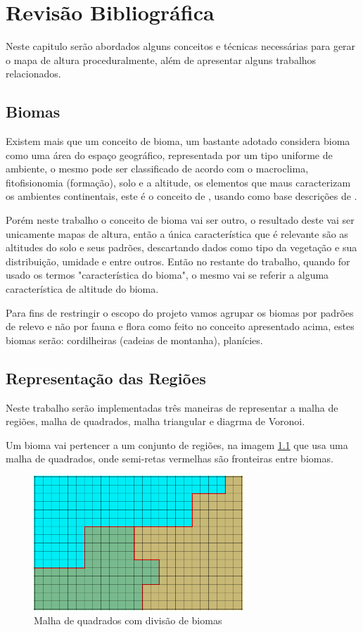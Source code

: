 \chapter{Revisão Bibliográfica}
Neste capitulo serão abordados alguns conceitos e técnicas necessárias para
gerar o mapa de altura proceduralmente, além de apresentar alguns trabalhos
relacionados.

\section{Biomas} %
Existem mais que um conceito de bioma, um bastante adotado considera bioma como
uma área do espaço geográfico, representada por um tipo uniforme de ambiente, o
mesmo pode ser classificado de acordo com o macroclima, fitofisionomia (formação),
solo e a altitude, os elementos que maus caracterizam os ambientes continentais, 
este é o conceito de \cite{coutinho2006conceito}, usando como base descrições
de \cite{walter1986vegetaccao}.

Porém neste trabalho o conceito de bioma vai ser outro, o resultado deste
vai ser unicamente mapas de altura, então a única característica que é relevante
são as altitudes do solo e seus padrões, descartando dados como tipo da
vegetação e sua distribuição, umidade e entre outros. Então no restante 
do trabalho, quando for usado os termos "característica do bioma", o mesmo vai
se referir a alguma característica de altitude do bioma.

Para fins de restringir o escopo do projeto vamos agrupar os biomas por padrões
de relevo e não por fauna e flora como feito no conceito apresentado acima,
estes biomas serão: cordilheiras (cadeias de montanha), planícies.

\section{Representação das Regiões}
Neste trabalho serão implementadas três maneiras de representar a malha de
regiões, malha de quadrados, malha triangular e diagrma de Voronoi.

Um bioma vai pertencer a um conjunto de regiões, na imagem \ref{fig:squadStripBiomes}
que usa uma malha de quadrados, onde semi-retas vermelhas são fronteiras entre
biomas.
\begin{figure}[H]
    \centering
    \includegraphics[width=0.7\textwidth]{figuras/squadStripBiomes.png}
    \caption{Malha de quadrados com divisão de biomas}
    \label{fig:squadStripBiomes}
\end{figure}
